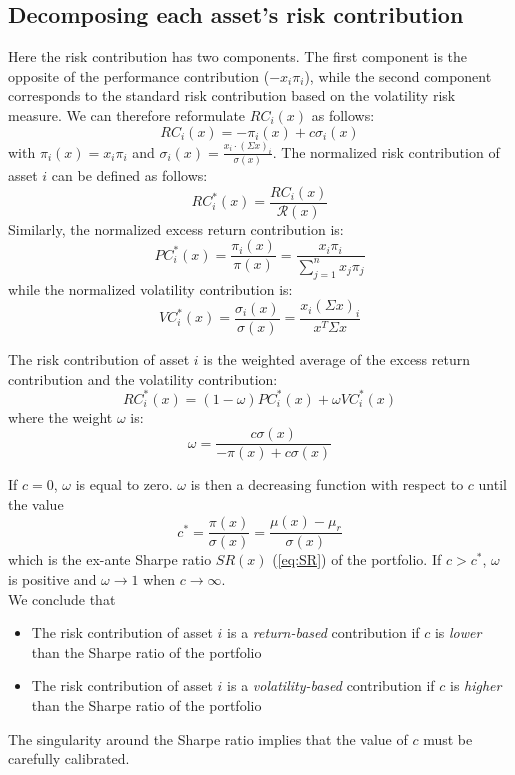 \subsection{Decomposing each asset's risk contribution}
Here the risk contribution has two components. The first component is the opposite of the performance contribution ($-x_i\pi_i$), while the second component corresponds to the standard risk contribution based on the volatility risk measure. We can therefore reformulate $RC_i(x)$ as follows:
\begin{equation}
RC_i(x) = -\pi_i(x) + c \sigma_i(x)
\end{equation}
with $\pi_i(x) = x_i\pi_i$ and $\sigma_i(x) = \frac{x_i \cdot (\Sigma x)_i}{\sigma(x)}$. The normalized risk contribution of asset $i$ can be defined as follows:
\begin{equation}
RC^*_i(x) = \frac{RC_i(x)}{\mathcal{R}(x)}
\end{equation}
Similarly, the normalized excess return contribution is:
\begin{equation}
PC^*_i(x) = \frac{\pi_i(x)}{\pi(x)} = \frac{x_i \pi_i}{\sum_{j=1}^n x_j \pi_j}
\end{equation}
while the normalized volatility contribution is:
\begin{equation}
VC^*_i(x) = \frac{\sigma_i(x)}{\sigma(x)} = \frac{x_i(\Sigma x)_i}{x^T \Sigma x}
\end{equation}

\begin{theorem}
The risk contribution of asset $i$ is the weighted average of the excess return contribution and the volatility contribution:
\begin{equation}
RC^*_i(x) = (1-\omega)PC^*_i(x) + \omega VC^*_i(x)
\end{equation}
where the weight $\omega$ is:
\begin{equation}
\omega = \frac{c \sigma(x)}{- \pi(x) + c\sigma(x)}
\end{equation}
\end{theorem}
If $c=0$, $\omega$ is equal to zero. $\omega$ is then a decreasing function with respect to $c$ until the value
\begin{equation}
c^* = \frac{\pi(x)}{\sigma (x)} = \frac{\mu(x)-\mu_r}{\sigma(x)}
\end{equation}
which is the ex-ante Sharpe ratio $SR(x)$ (\ref{eq:SR}) of the portfolio. If $c > c^*$, $\omega$ is positive and $\omega \rightarrow 1$ when $c \rightarrow \infty$.\\
We conclude that
\begin{itemize}
\item The risk contribution of asset $i$ is a \textit{return-based} contribution if $c$ is \textit{lower} than the Sharpe ratio of the portfolio
\item The risk contribution of asset $i$ is a \textit{volatility-based} contribution if $c$ is \textit{higher} than the Sharpe ratio of the portfolio
\end{itemize}
The singularity around the Sharpe ratio implies that the value of $c$ must be carefully calibrated.

